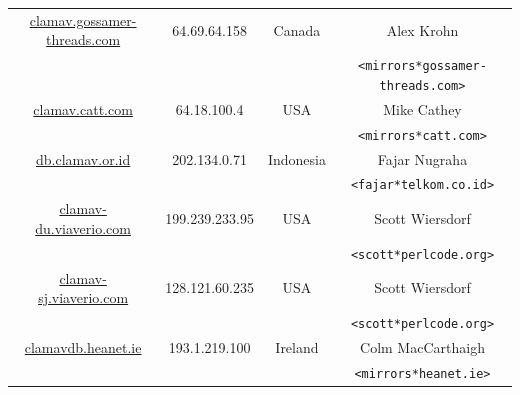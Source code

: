 \documentclass[a4paper,titlepage,12pt]{article}
\newcommand{\email}[1]{\texttt{#1}}
\begin{document}
\begin{center}
{\begin{tabular}{|c|c|c|c|}
	\url{clamav.gossamer-threads.com} & 64.69.64.158 & Canada & Alex Krohn\\
				          &		 &	  & \email{<mirrors*gossamer-threads.com>}\\ \hline
					  
	\url{clamav.catt.com} & 64.18.100.4 & USA & Mike Cathey\\
			      &		    &	  & \email{<mirrors*catt.com>}\\ \hline

	\url{db.clamav.or.id} & 202.134.0.71 & Indonesia & Fajar Nugraha\\
				     &             &           & \email{<fajar*telkom.co.id>}\\ \hline
	\url{clamav-du.viaverio.com} & 199.239.233.95 & USA & Scott Wiersdorf\\
				     &		      &	    & \email{<scott*perlcode.org>}\\ \hline
	\url{clamav-sj.viaverio.com} & 128.121.60.235 & USA & Scott Wiersdorf\\
				     &		      &	    & \email{<scott*perlcode.org>}\\ \hline
	\url{clamavdb.heanet.ie} & 193.1.219.100 & Ireland & Colm MacCarthaigh\\
				 &		 &	   & \email{<mirrors*heanet.ie>}\\ \hline
    \end{tabular}}
    \end{center}
\end{document}
